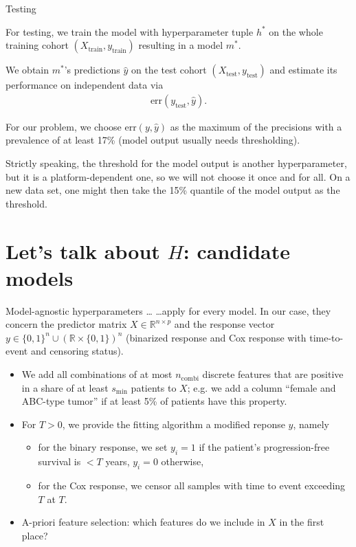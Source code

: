 \documentclass[10pt, aspectratio=169]{beamer}
\def\RR{\mathbb{R}}
\begin{document}
\begin{frame}{Testing}

  For testing, we train the model with hyperparameter tuple $h^*$ on the whole
  training cohort $(X_\text{train}, y_{\text{train}})$ resulting in a model $m^*$.

  We obtain $m^*$'s predictions $\hat{y}$ on the test cohort 
  $(X_{\text{test}}, y_{\text{test}})$ and estimate 
  its performance on independent data via
  \begin{align*}
    \text{err}(y_{\text{test}}, \hat{y}).
  \end{align*}

  \pause
  For our problem, we choose $\text{err}(y, \hat{y})$ as the maximum of the precisions
  with a prevalence of at least 17\% (model output usually needs thresholding).

  Strictly speaking, the threshold for the model output is another hyperparameter, 
  but it is a platform-dependent one, so we will not choose it once and for all. 
  On a new data set, one might then take the 15\% quantile of the model output 
  as the threshold.
\end{frame}

\section{Let's talk about $H$: candidate models}

\begin{frame}{Model-agnostic hyperparameters \ldots}
  \ldots apply for every model. In our case, they concern the predictor matrix 
  $X \in \RR^{n \times p}$ and the response vector $y \in \{ 0, 1 \}^n \cup 
  (\RR \times \{0, 1 \})^n$ (binarized response and Cox response with time-to-event 
  and censoring status).

  \begin{itemize}
    \item We add all combinations of at most $n_{\text{combi}}$ discrete features 
      that are positive in a share of at least $s_{\text{min}}$ patients to $X$; e.g. 
      we add a column ``female and ABC-type tumor'' if at least 5\% of patients 
      have this property.
    \pause
    \item For $T > 0$, we provide the fitting algorithm a modified reponse $y$, namely
      \begin{itemize}
        \item for the binary response, we set $y_i = 1$ if the patient's progression-free 
          survival is $< T$ years, $y_i = 0$ otherwise,
        \item for the Cox response, we censor all samples with time to event 
          exceeding $T$ at $T$.
      \end{itemize}
    \pause
    \item A-priori feature selection: which features do we include in $X$ in the 
      first place?
  \end{itemize}
\end{frame}
\end{document}
